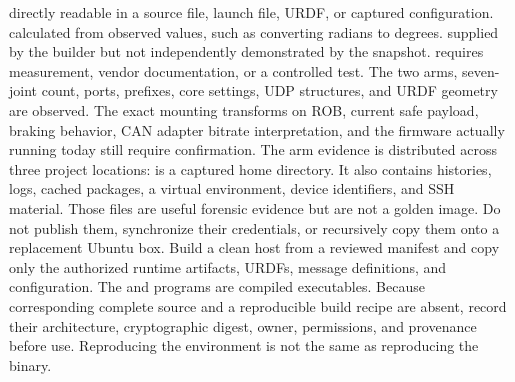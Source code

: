{}\markdownRendererUlBegin
\markdownRendererUlItem {} directly readable in a source file, launch file, URDF, or captured configuration.\markdownRendererUlItemEnd 
\markdownRendererUlItem {} calculated from observed values, such as converting radians to degrees.\markdownRendererUlItemEnd 
\markdownRendererUlItem {} supplied by the builder but not independently demonstrated by the snapshot.\markdownRendererUlItemEnd 
\markdownRendererUlItem {} requires measurement, vendor documentation, or a controlled test.\markdownRendererUlItemEnd 
\markdownRendererUlEnd \markdownRendererInterblockSeparator
{}The two arms, seven-joint count, ports, prefixes, core settings, UDP structures, and URDF geometry are observed. The exact mounting transforms on ROB, current safe payload, braking behavior, CAN adapter bitrate interpretation, and the firmware actually running today still require confirmation.\markdownRendererInterblockSeparator
{}
\markdownRendererSectionEnd 
\markdownRendererSectionEnd \markdownRendererSectionBegin
{}\markdownRendererInterblockSeparator
{}The arm evidence is distributed across three project locations:\markdownRendererInterblockSeparator
{}\markdownRendererInterblockSeparator
{} is a captured home directory. It also contains histories, logs, cached packages, a virtual environment, device identifiers, and SSH material. Those files are useful forensic evidence but are not a golden image. Do not publish them, synchronize their credentials, or recursively copy them onto a replacement Ubuntu box. Build a clean host from a reviewed manifest and copy only the authorized runtime artifacts, URDFs, message definitions, and configuration.\markdownRendererParagraphSeparator
{}The  and  programs are compiled executables. Because corresponding complete source and a reproducible build recipe are absent, record their architecture, cryptographic digest, owner, permissions, and provenance before use. Reproducing the environment is not the same as reproducing the binary.\markdownRendererInterblockSeparator
